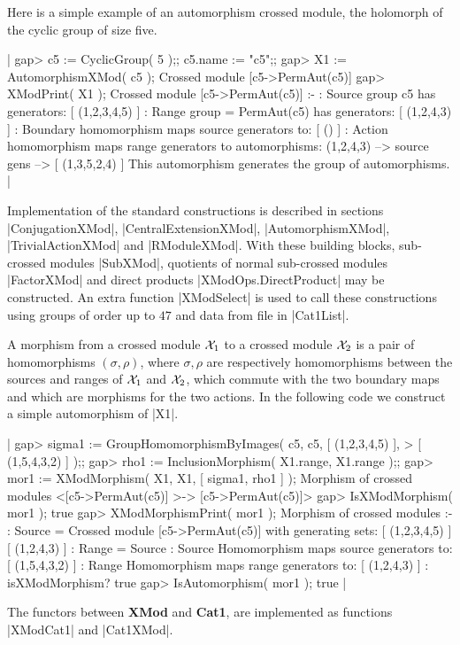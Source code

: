 Here   is a simple  example of   an automorphism  crossed  module, the
holomorph of the cyclic group of size five.

|    gap> c5 := CyclicGroup( 5 );;   c5.name := "c5";;
    gap> X1 := AutomorphismXMod( c5 );
    Crossed module [c5->PermAut(c5)]
    gap> XModPrint( X1 );
    Crossed module [c5->PermAut(c5)] :- 
    : Source group c5 has generators:
      [ (1,2,3,4,5) ]
    : Range group = PermAut(c5) has generators:
      [ (1,2,4,3) ]
    : Boundary homomorphism maps source generators to:
      [ () ]
    : Action homomorphism maps range generators to automorphisms:
      (1,2,4,3) --> { source gens --> [ (1,3,5,2,4) ] }
      This automorphism generates the group of automorphisms.    |


Implementation of the  standard constructions is described in sections
|ConjugationXMod|,    |CentralExtensionXMod|,      |AutomorphismXMod|,
|TrivialActionXMod| and  |RModuleXMod|.  With  these  building blocks,
sub-crossed modules |SubXMod|, quotients of normal sub-crossed modules
|FactorXMod|  and  direct  products  |XModOps.DirectProduct|  may   be
constructed.  An   extra function |XModSelect|  is used  to call these
constructions using groups of  order up to  $47$ and data from file in
|Cat1List|.

A morphism  from  a crossed module ${\cal  X}_1$  to a crossed  module
${\cal  X}_2$ is  a  pair  of homomorphisms  $(\sigma,  \rho)$,  where
$\sigma, \rho$ are respectively homomorphisms  between the sources and
ranges of  ${\cal X}_1$ and ${\cal X}_2$,  which  commute with the two
boundary  maps and which are  morphisms  for the two  actions.  In the
following code we construct a simple automorphism of |X1|.

|    gap> sigma1 := GroupHomomorphismByImages( c5, c5, [ (1,2,3,4,5) ],
    >        [ (1,5,4,3,2) ] );;
    gap> rho1 := InclusionMorphism( X1.range, X1.range );;
    gap> mor1 := XModMorphism( X1, X1, [ sigma1, rho1 ] );
    Morphism of crossed modules <[c5->PermAut(c5)] >-> [c5->PermAut(c5)]>
    gap> IsXModMorphism( mor1 );
    true
    gap> XModMorphismPrint( mor1 );
    Morphism of crossed modules :- 
    : Source = Crossed module [c5->PermAut(c5)] with generating sets:
      [ (1,2,3,4,5) ]
      [ (1,2,4,3) ]
    : Range = Source
    : Source Homomorphism maps source generators to:
      [ (1,5,4,3,2) ]
    : Range Homomorphism maps range generators to:
      [ (1,2,4,3) ]
    : isXModMorphism? true
    gap> IsAutomorphism( mor1 );
    true  |

The functors between  \textbf{XMod} and \textbf{Cat1}, are implemented
as functions |XModCat1| and |Cat1XMod|.

